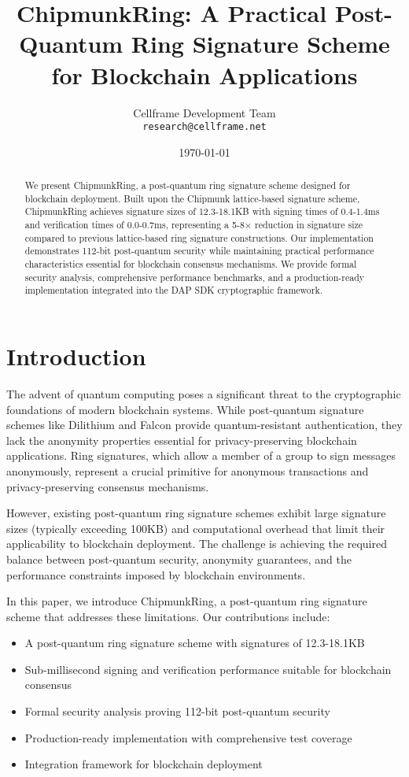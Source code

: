 \documentclass[11pt,a4paper]{article}
\title{ChipmunkRing: A Practical Post-Quantum Ring Signature Scheme for Blockchain Applications}
\author{
Cellframe Development Team\\
\texttt{research@cellframe.net}
}
\date{\today}
\begin{document}
\maketitle

\begin{abstract}
We present ChipmunkRing, a post-quantum ring signature scheme designed for blockchain deployment. Built upon the Chipmunk lattice-based signature scheme, ChipmunkRing achieves signature sizes of 12.3-18.1KB with signing times of 0.4-1.4ms and verification times of 0.0-0.7ms, representing a 5-8× reduction in signature size compared to previous lattice-based ring signature constructions. Our implementation demonstrates 112-bit post-quantum security while maintaining practical performance characteristics essential for blockchain consensus mechanisms. We provide formal security analysis, comprehensive performance benchmarks, and a production-ready implementation integrated into the DAP SDK cryptographic framework.
\end{abstract}

\section{Introduction}

The advent of quantum computing poses a significant threat to the cryptographic foundations of modern blockchain systems. While post-quantum signature schemes like Dilithium and Falcon provide quantum-resistant authentication, they lack the anonymity properties essential for privacy-preserving blockchain applications. Ring signatures, which allow a member of a group to sign messages anonymously, represent a crucial primitive for anonymous transactions and privacy-preserving consensus mechanisms.

However, existing post-quantum ring signature schemes exhibit large signature sizes (typically exceeding 100KB) and computational overhead that limit their applicability to blockchain deployment. The challenge is achieving the required balance between post-quantum security, anonymity guarantees, and the performance constraints imposed by blockchain environments.

In this paper, we introduce ChipmunkRing, a post-quantum ring signature scheme that addresses these limitations. Our contributions include:

\begin{itemize}
\item A post-quantum ring signature scheme with signatures of 12.3-18.1KB
\item Sub-millisecond signing and verification performance suitable for blockchain consensus
\item Formal security analysis proving 112-bit post-quantum security
\item Production-ready implementation with comprehensive test coverage
\item Integration framework for blockchain deployment
\end{itemize}
\end{document}

